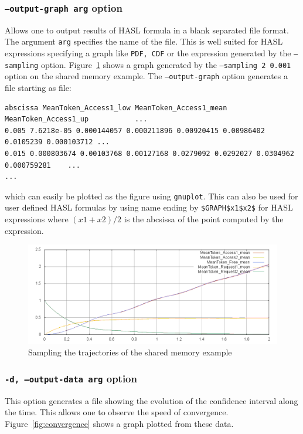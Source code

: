 \documentclass{article}
\begin{document}
\subsubsection{\texttt{--output-graph arg} option}
Allows one to output results of HASL formula in a blank separated file
format. The argument \texttt{arg} specifies the name of the file.  This
is well suited for HASL expressions specifying a graph like
\texttt{PDF, CDF} or the expression generated by the
\texttt{--sampling} option.  Figure~\ref{fig:sampling} shows a graph
generated by the \texttt{--sampling 2 0.001} option on the shared
memory example. The \texttt{--output-graph} option generates a file
starting as file:
\begin{scriptsize}
\begin{verbatim}
abscissa MeanToken_Access1_low MeanToken_Access1_mean MeanToken_Access1_up           ... 
0.005 7.6218e-05 0.000144057 0.000211896 0.00920415 0.00986402 0.0105239 0.000103712 ...
0.015 0.000803674 0.00103768 0.00127168 0.0279092 0.0292027 0.0304962 0.000759281    ...
...
\end{verbatim}
\end{scriptsize}
which can easily be plotted as the figure using \texttt{gnuplot}.
{\color{red}This can also be used for user defined HASL formulas by using name ending by
\verb|$GRAPH$x1$x2$| for HASL expressions where $(x1+x2)/2$ is the
abcsissa of the point computed by the expression.}

\begin{figure}[h]
  \centering
  \includegraphics[width=1.01\textwidth]{figures/sampling.png}
  \caption{Sampling the trajectories of the shared memory example}
  \label{fig:sampling}
\end{figure}

\subsubsection{\texttt{-d, --output-data arg} option}
This option generates a file showing the evolution of the confidence
interval along the time. This allows one to observe the speed of
convergence. Figure~\ref{fig:convergence} shows a graph plotted from
these data.
\end{document}
